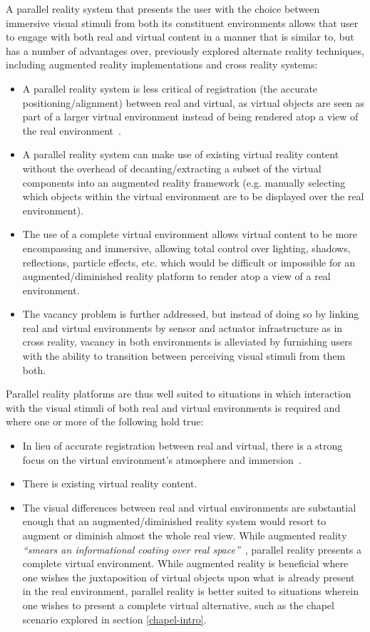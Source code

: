 A parallel reality system that presents the user with the choice between immersive visual stimuli from both its constituent environments allows that user to engage with both real and virtual content in a manner that is similar to, but has a number of advantages over, previously explored alternate reality techniques, including augmented reality implementations and cross reality systems:

\begin{itemize}
	\item A parallel reality system is less critical of registration (the accurate positioning/alignment) between real and virtual, as virtual objects are seen as part of a larger virtual environment instead of being rendered atop a view of the real environment~\cite{Azuma1997}.
	\item A parallel reality system can make use of existing virtual reality content without the overhead of decanting/extracting a subset of the virtual components into an augmented reality framework (e.g. manually selecting which objects within the virtual environment are to be displayed over the real environment).
	\item The use of a complete virtual environment allows virtual content to be more encompassing and immersive, allowing total control over lighting, shadows, reflections, particle effects, etc. which would be difficult or impossible for an augmented/diminished reality platform to render atop a view of a real environment.
	\item The vacancy problem is further addressed, but instead of doing so by linking real and virtual environments by sensor and actuator infrastructure as in cross reality, vacancy in both environments is alleviated by furnishing users with the ability to transition between perceiving visual stimuli from them both.
\end{itemize}

Parallel reality platforms are thus well suited to situations in which interaction with the visual stimuli of both real and virtual environments is required and where one or more of the following hold true:

\begin{itemize}
	\item In lieu of accurate registration between real and virtual, there is a strong focus on the virtual environment's atmosphere and immersion~\cite{deamicis:gamebased}.
	\item There is existing virtual reality content.
	\item The visual differences between real and virtual environments are substantial enough that an augmented/diminished reality system would resort to augment or diminish almost the whole real view. While augmented reality \textit{``smears an informational coating over real space''}~\cite{Andersen}, parallel reality presents a complete virtual environment. While augmented reality is beneficial where one wishes the juxtaposition of virtual objects upon what is already present in the real environment, parallel reality is better suited to situations wherein one wishes to present a complete virtual alternative, such as the chapel scenario explored in section \ref{chapel-intro}.
\end{itemize}

